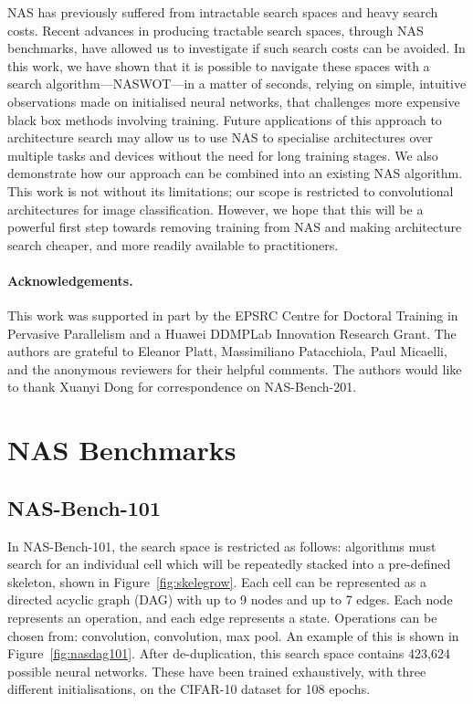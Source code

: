 \documentclass{article}
\begin{document}
NAS has previously suffered from intractable search spaces and heavy search costs. Recent advances in producing tractable search spaces, through NAS benchmarks, have allowed us to investigate if such search costs can be avoided. In this work, we have shown that it is possible to navigate these spaces with a search algorithm---NASWOT---in a matter of seconds, relying on simple, intuitive observations made on initialised neural networks, that challenges more expensive black box methods involving training. Future applications of this approach to architecture search may allow us to use NAS to specialise architectures over multiple tasks and devices without the need for long training stages.
We also demonstrate how our approach can be combined into an existing NAS algorithm. This work is not without its limitations; our scope is restricted to convolutional architectures for image classification. However, we hope that this will be a powerful first step towards removing training from NAS and making architecture search cheaper, and more readily available to practitioners.


\vspace{-2mm}
\paragraph{Acknowledgements.} { This work was supported in part by the EPSRC Centre for Doctoral Training in Pervasive Parallelism and a Huawei DDMPLab Innovation Research Grant. The authors are grateful to Eleanor Platt, Massimiliano Patacchiola, Paul Micaelli, and the anonymous reviewers for their helpful comments. The authors would like to thank Xuanyi Dong for correspondence on NAS-Bench-201.}






\clearpage 
\appendix




\section{NAS Benchmarks}
\label{appendix:nasbench}


\subsection{NAS-Bench-101}
In NAS-Bench-101, the search space is restricted as follows: algorithms must search for an individual cell which will be repeatedly stacked into a pre-defined skeleton, shown in Figure~\ref{fig:skelegrow}. Each cell can be represented as a directed acyclic graph (DAG) with up to 9 nodes and up to 7 edges. Each node represents an operation, and each edge represents a state. Operations can be chosen from:  convolution,  convolution,  max pool. An example of this is shown in Figure~\ref{fig:nasdag101}. After de-duplication, this search space contains 423,624 possible neural networks. These have been trained exhaustively, with three different initialisations, on the CIFAR-10 dataset for 108 epochs. 
\end{document}
